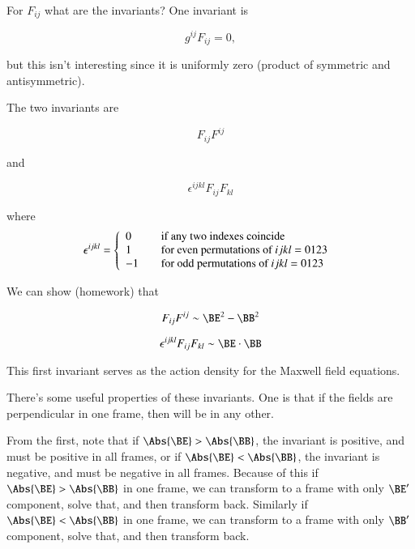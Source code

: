 For $F_{i j}$ what are the invariants?  One invariant is

\begin{equation}\label{eqn:relativisticElectrodynamicsL11:550}
g^{i j} F_{i j} = 0,
\end{equation}

but this isn't interesting since it is uniformly zero (product of symmetric and antisymmetric).

The two invariants are

\begin{equation}\label{eqn:relativisticElectrodynamicsL11:570}
F_{i j}F^{i j}
\end{equation}

and 

\begin{equation}\label{eqn:relativisticElectrodynamicsL11:590}
\epsilon^{i j k l} F_{i j}F_{k l}
\end{equation}

where
\begin{equation}\label{eqn:relativisticElectrodynamicsL11:610}
\epsilon^{i j k l} =
\left\{
\begin{array}{l l}
0 & \quad \mbox{if any two indexes coincide} \\
1 & \quad \mbox{for even permutations of $i j k l=0123$ } \\
-1 & \quad \mbox{for odd permutations of $i j k l=0123$ } \\
\end{array}
\right.
\end{equation}

We can show (homework) that

\begin{equation}\label{eqn:relativisticElectrodynamicsL11:630}
F_{i j}F^{i j} \sim \BE^2 - \BB^2
\end{equation}

\begin{equation}\label{eqn:relativisticElectrodynamicsL11:650}
\epsilon^{i j k l} F_{i j}F_{k l} \sim \BE \cdot \BB
\end{equation}

This first invariant serves as the action density for the Maxwell field equations.

There's some useful properties of these invariants.  One is that if the fields are perpendicular in one frame, then will be in any other.  

From the first, note that if $\Abs{\BE} > \Abs{\BB}$, the invariant is positive, and must be positive in all frames, or if $\Abs{\BE} < \Abs{\BB}$, the invariant is negative, and must be negative in all frames.  Because of this if $\Abs{\BE} > \Abs{\BB}$ in one frame, we can transform to a frame with only $\BE'$ component, solve that, and then transform back.  Similarly if $\Abs{\BE} < \Abs{\BB}$ in one frame, we can transform to a frame with only $\BB'$ component, solve that, and then transform back.

